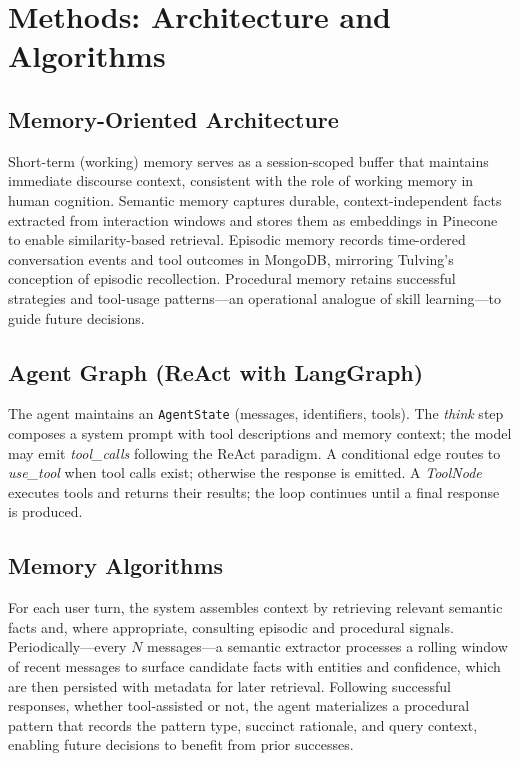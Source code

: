 \documentclass[11pt]{article}
\begin{document}
\section{Methods: Architecture and Algorithms}
\subsection{Memory-Oriented Architecture}
Short-term (working) memory serves as a session-scoped buffer that maintains immediate discourse context, consistent with the role of working memory in human cognition\cite{baddeley1992working}. Semantic memory captures durable, context-independent facts extracted from interaction windows and stores them as embeddings in Pinecone to enable similarity-based retrieval\cite{lewis2020rag}. Episodic memory records time-ordered conversation events and tool outcomes in MongoDB, mirroring Tulving's conception of episodic recollection\cite{tulving1972episodic}. Procedural memory retains successful strategies and tool-usage patterns---an operational analogue of skill learning\cite{anderson1982skill}---to guide future decisions.

\subsection{Agent Graph (ReAct with LangGraph)}
The agent maintains an \texttt{AgentState} (messages, identifiers, tools). The \emph{think} step composes a system prompt with tool descriptions and memory context; the model may emit \emph{tool\_calls} following the ReAct paradigm\cite{yao2022react}. A conditional edge routes to \emph{use\_tool} when tool calls exist; otherwise the response is emitted. A \emph{ToolNode} executes tools and returns their results; the loop continues until a final response is produced.

\subsection{Memory Algorithms}
For each user turn, the system assembles context by retrieving relevant semantic facts and, where appropriate, consulting episodic and procedural signals. Periodically---every $N$ messages---a semantic extractor processes a rolling window of recent messages to surface candidate facts with entities and confidence, which are then persisted with metadata for later retrieval. Following successful responses, whether tool-assisted or not, the agent materializes a procedural pattern that records the pattern type, succinct rationale, and query context, enabling future decisions to benefit from prior successes.
\end{document}
